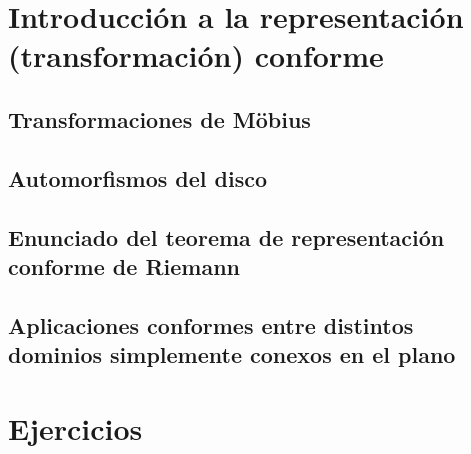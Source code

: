 \documentclass{apuntes}
\begin{document}
\chapter{Introducción a la representación (transformación) conforme}
\section{Transformaciones de Möbius}
\section{Automorfismos del disco}
\section{Enunciado del teorema de representación conforme de Riemann}
\section{Aplicaciones conformes entre distintos dominios simplemente conexos en el plano}


\appendix

\chapter{Ejercicios}

\printindex
\end{document}
